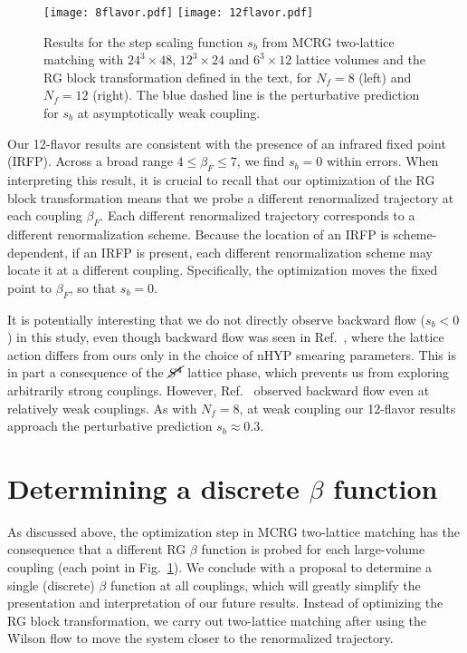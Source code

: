 \documentclass{PoS}
\newcommand{\be}{\ensuremath{\beta} }
\newcommand{\X}{\ensuremath{\!\times\!} }
\newcommand{\Sb}{\ensuremath{\cancel{S^4}} }
\newcommand{\refcite}[1]{Ref.~\cite{#1}}
\newcommand{\fig}[1]{Fig.~\ref{#1}}
\begin{document}
\begin{figure}[htpb]
  \centering
  \texttt{[image: 8flavor.pdf]}\hfill
  \texttt{[image: 12flavor.pdf]}\hfill
  \caption{Results for the step scaling function $s_b$ from MCRG two-lattice matching with $24^3\X48$, $12^3\X24$ and $6^3\X12$ lattice volumes and the RG block transformation defined in the text, for $N_f = 8$ (left) and $N_f = 12$ (right).  The blue dashed line is the perturbative prediction for $s_b$ at asymptotically weak coupling.}
  \label{fig:MCRG}
\end{figure}

Our 12-flavor results are consistent with the presence of an infrared fixed point (IRFP).
Across a broad range $4 \leq \be_F \leq 7$, we find $s_b = 0$ within errors.
When interpreting this result, it is crucial to recall that our optimization of the RG block transformation means that we probe a different renormalized trajectory at each coupling $\be_F$.
Each different renormalized trajectory corresponds to a different renormalization scheme.
Because the location of an IRFP is scheme-dependent, if an IRFP is present, each different renormalization scheme may locate it at a different coupling.
Specifically, the optimization moves the fixed point to $\be_F$, so that $s_b = 0$.

It is potentially interesting that we do not directly observe backward flow ($s_b < 0$) in this study, even though backward flow was seen in \refcite{Hasenfratz:2011xn}, where the lattice action differs from ours only in the choice of nHYP smearing parameters.
This is in part a consequence of the \Sb lattice phase, which prevents us from exploring arbitrarily strong couplings.
However, \refcite{Hasenfratz:2011xn} observed backward flow even at relatively weak couplings.
As with $N_f = 8$, at weak coupling our 12-flavor results approach the perturbative prediction $s_b \approx 0.3$.



\section{\label{sec:Wflow}Determining a discrete \be function} %
As discussed above, the optimization step in MCRG two-lattice matching has the consequence that a different RG \be function is probed for each large-volume coupling (each point in \fig{fig:MCRG}).
We conclude with a proposal to determine a single (discrete) $\beta$ function at all couplings, which will greatly simplify the presentation and interpretation of our future results.
Instead of optimizing the RG block transformation, we carry out two-lattice matching after using the Wilson flow to move the system closer to the renormalized trajectory.
\end{document}
